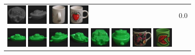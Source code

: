 \begin{figure}[tbp]
\begin{tabular}{m{11cm} | m{3cm} |}
\includegraphics[width=1cm]{coil/beeld-26.eps}
\includegraphics[width=1cm]{coil/beeld-29.eps}
\includegraphics[width=1cm]{coil/beeld-41.eps}
\includegraphics[width=1cm]{coil/beeld-36.eps}
& {\scriptsize 0.0}
\\
\includegraphics[width=1cm]{coil/beeld-54.eps}
\includegraphics[width=1cm]{coil/beeld-55.eps}
\includegraphics[width=1cm]{coil/beeld-57.eps}
\includegraphics[width=1cm]{coil/beeld-58.eps}
\includegraphics[width=1cm]{coil/beeld-59.eps}
\includegraphics[width=1cm]{coil/beeld-56.eps}
\includegraphics[width=1cm]{coil/beeld-60.eps}
\includegraphics[width=1cm]{coil/beeld-32.eps}

\end{tabular}
\end{figure}
